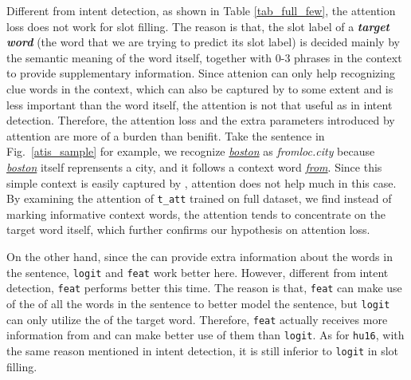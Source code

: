 Different from intent detection, as shown in Table \ref{tab_full_few}, the attention loss does not work for slot filling.
The reason is that, the slot label of a \textbf{\emph{target word}} (the word that we are trying to predict its slot label) is decided mainly by the semantic meaning of the word itself, together with 0-3 phrases in the context to provide supplementary information.
Since attenion can only help recognizing clue words in the context, which can also be captured by \BLSTM to some extent and is less important than the word itself, the attention is not that useful as in intent detection.
Therefore, the attention loss and the extra parameters introduced by attention are more of a burden than benifit.
Take the sentence in Fig.~\ref{atis_sample} for example, we recognize \textsl{\underline{boston}} as \emph{fromloc.city} because \textsl{\underline{boston}} itself reprensents a city, and it follows a context word \textsl{\underline{from}}. Since this simple context is easily
captured by \BLSTM, attention does not help much in this case. 
By examining the attention of \texttt{t\_att} trained on full dataset,
we find instead of marking informative context words, the attention tends to concentrate on the target word itself, which
further confirms our hypothesis on attention loss.

On the other hand, since the \REtags can provide extra information about the words in the sentence, \texttt{logit} and \texttt{feat} work better here.
However, different from intent detection, \texttt{feat} performs better this time.
The reason is that, \texttt{feat} can make use of the \REtags of all the words in the sentence to better model the sentence, but \texttt{logit} can only utilize the \REtag of the target word.
Therefore, \texttt{feat} actually receives more information from \RE and can make better use of them than \texttt{logit}.
As for \texttt{hu16}, with the same reason mentioned in intent detection, it is still inferior to \texttt{logit} in slot filling.

